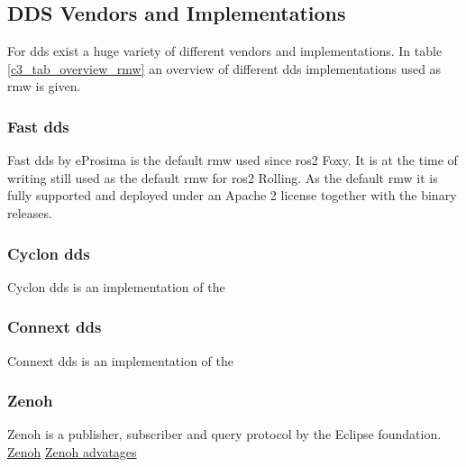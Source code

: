 \subsection{DDS Vendors and Implementations}
For \gls{dds} exist a huge variety of different vendors and implementations. In table \ref{c3_tab_overview_rmw} an overview of different \gls{dds} implementations used as \gls{rmw} is given.
\subsubsection*{Fast \gls{dds}}
Fast \gls{dds} by eProsima is the default \gls{rmw} used since \gls{ros2} Foxy. It is at the time of writing still used as the default \gls{rmw} for \gls{ros2} Rolling. As the default \gls{rmw} it is fully supported and deployed under an Apache 2 license together with the binary releases. 
\subsubsection*{Cyclon \gls{dds}}
Cyclon \gls{dds} is an implementation of the 
\subsubsection*{Connext \gls{dds}}
Connext \gls{dds} is an implementation of the 
\subsubsection*{Zenoh}
Zenoh is a publisher, subscriber and query protocol by the Eclipse foundation.
\href{https://www.adlinktech.com/en/Zenoh}{Zenoh} 
\href{https://zenoh.io/blog/2021-03-23-discovery/}{Zenoh advatages} 


